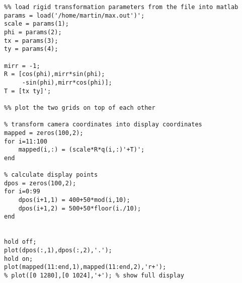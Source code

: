 {\begin{verbatim}
%% load rigid transformation parameters from the file into matlab
params = load('/home/martin/max.out')';
scale = params(1);
phi = params(2);
tx = params(3);
ty = params(4);

mirr = -1;
R = [cos(phi),mirr*sin(phi);
     -sin(phi),mirr*cos(phi)];
T = [tx ty]';

%% plot the two grids on top of each other

% transform camera coordinates into display coordinates
mapped = zeros(100,2);
for i=11:100
    mapped(i,:) = (scale*R*q(i,:)'+T)';
end

% calculate display points
dpos = zeros(100,2);
for i=0:99
    dpos(i+1,1) = 400+50*mod(i,10);
    dpos(i+1,2) = 500+50*floor(i./10);
end


hold off;
plot(dpos(:,1),dpos(:,2),'.');
hold on;
plot(mapped(11:end,1),mapped(11:end,2),'r+');
% plot([0 1280],[0 1024],'+'); % show full display
\end{verbatim}}

